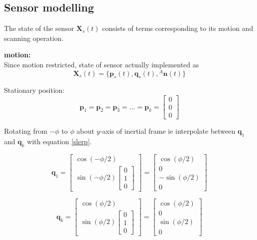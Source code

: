 \subsection{Sensor modelling}
The state of the sensor $\mathbf{X}_{s}(t)$ consists of terms corresponding to its motion and scanning operation. 

\textbf{motion:}\\
Since motion restricted, state of sensor actually implemented as 
\begin{equation}
	\mathbf{X}_{s}(t) = \{\mathbf{p}_s(t),\mathbf{q}_s(t),{^{A}\mathbf{n}(t)}\}
\end{equation}

Stationary position:
\begin{equation}
	\mathbf{p}_1 = \mathbf{p}_2 = \mathbf{p}_3 = \dots =  \mathbf{p}_k = 
	\begin{bmatrix}
		0 \\ 0 \\ 0
   	\end{bmatrix}
\end{equation}

													
Rotating from $-\phi$ to $\phi$ about $y$-axis of inertial frame ie interpolate between $\mathbf{q}_1$ and $\mathbf{q}_k$ with equation \ref{slerp}.
	
\begin{equation}
	\mathbf{q}_1 = \begin{bmatrix}
				 	\cos(-\phi/2) \\
				 	\sin(-\phi/2){\begin{bmatrix}
								 	0 \\ 1 \\ 0
							   	 \end{bmatrix}}
				 \end{bmatrix}
				 = \begin{bmatrix}
		 		   		\cos(\phi/2) \\ 0 \\ -\sin(\phi/2) \\ 0
				   \end{bmatrix}
\end{equation}

\begin{equation}
	\mathbf{q}_k = \begin{bmatrix}
				 	\cos(\phi/2) \\
				 	\sin(\phi/2){\begin{bmatrix}
								 	0 \\ 1 \\ 0
							   	 \end{bmatrix}}
				 \end{bmatrix}
				 = \begin{bmatrix}
		 		   		\cos(\phi/2) \\ 0 \\ \sin(\phi/2) \\ 0
				   \end{bmatrix}
\end{equation}

